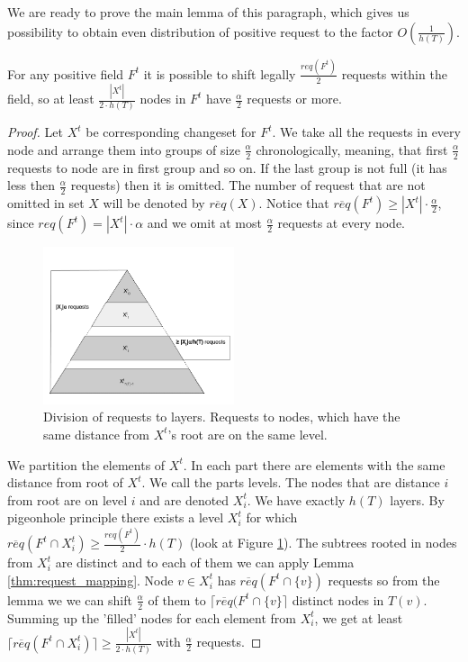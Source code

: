 We are ready to prove the main lemma of this paragraph, which gives us 
possibility to obtain even distribution of positive request to the factor 
$O(\frac{1}{h(T)})$.
\begin{lemma}
For any positive field $F^t$ it is possible to shift 
legally $\frac{req(F^t)}{2}$ requests within the field, so at least 
$\frac{|X^t|}{2 \cdot h(T)}$ nodes in $F^t$ have 
$\frac{\alpha}{2}$ requests or more.
\label{thm:legal_shifting_down}
\end{lemma}
\begin{proof}
Let $X^t$ be corresponding changeset for $F^t$. We take all the requests in 
every node and arrange them into groups of size $\frac{\alpha}{2}$ 
chronologically, meaning, that first $\frac{\alpha}{2}$ requests to node are in 
first 
group and so on. If the last group is not full (it has less then  
$\frac{\alpha}{2}$ requests) then it is omitted. The number of request that are 
not omitted in set $X$ will be denoted by $\overline{req}(X)$. Notice that  
$\overline{req}(F^t) \geq |X^t| \cdot \frac{\alpha}{2}$, since $req(F^t) = 
|X^t| \cdot \alpha$ and we omit at most $\frac{\alpha}{2}$ requests at every 
node.
 \begin{figure}
 \begin{center}
  \includegraphics[width=0.5\textwidth]{layers.png}
\end{center}
\caption{Division of requests to layers. Requests to nodes, which have the same 
distance from $X^t$'s root are on the same level.}
\label{fig:layers}
\end{figure}

We partition the elements of $X^t$. In each part there are elements with the 
same distance from root of $X^t$. We call the parts levels. The nodes that are 
distance $i$ from root are on level $i$ and are denoted $X^t_i$. We 
have exactly $h(T)$ layers. By pigeonhole principle there exists a level 
$X^t_i$ for which $\overline{req}(F^t \cap X^t_i) \geq \frac{req(F^t)}{2} \cdot 
h(T)$ (look at Figure \ref{fig:layers}). The subtrees rooted in nodes from 
$X^t_i$ are distinct and to each of them we can apply Lemma 
\ref{thm:request_mapping}. Node $v \in X^t_i$ has $\overline{req}(F^t \cap 
\{v\})$ requests so from the lemma we we can shift $\frac{\alpha}{2}$ of 
them to $\lceil \overline{req}(F^t \cap \{v\} \rceil$ distinct nodes in $T(v)$. 
Summing up the 'filled' nodes for each element from $X^t_i$, we get at least 
$\lceil \overline{req}(F^t \cap X^t_i) \rceil \geq \frac{|X^t|}{2 \cdot h(T)}$ 
with $\frac{\alpha}{2}$ requests.
\end{proof}
